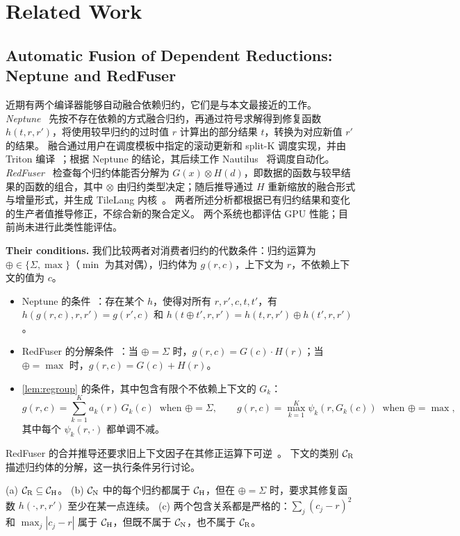 \section{Related Work}
\label{sec:related}

\subsection{Automatic Fusion of Dependent Reductions: Neptune and RedFuser}
\label{sec:related-prior}

近期有两个编译器能够自动融合依赖归约，它们是与本文最接近的工作。
\emph{Neptune}~\citep{neptune} 先按不存在依赖的方式融合归约，再通过符号求解得到修复函数 $h(t,r,r')$，将使用较早归约的过时值 $r$ 计算出的部分结果 $t$，转换为对应新值 $r'$ 的结果。
融合通过用户在调度模板中指定的滚动更新和 split-K 调度实现，并由 Triton 编译~\citep{triton}；根据 Neptune 的结论，其后续工作 Nautilus~\citep{nautilus} 将调度自动化。
\emph{RedFuser}~\citep{redfuser} 检查每个归约体能否分解为 $G(x)\otimes H(d)$，即数据的函数与较早结果的函数的组合，其中 $\otimes$ 由归约类型决定；随后推导通过 $H$ 重新缩放的融合形式与增量形式，并生成 TileLang 内核~\citep{tilelang}。
两者所述分析都根据已有归约结果和变化的生产者值推导修正，不综合新的聚合定义。
两个系统也都评估 GPU 性能；\sys 目前尚未进行此类性能评估。

\textbf{Their conditions.}
我们比较两者对消费者归约的代数条件：归约运算为 $\oplus\in\{\Sigma,\max\}$（$\min$ 为其对偶），归约体为 $g(r,c)$，上下文为 $r$，不依赖上下文的值为 $c$。
\begin{itemize}
\item[$\Cls{N}$:] Neptune 的条件~\citep[Eq.~3--4]{neptune}：存在某个 $h$，使得对所有 $r,r',c,t,t'$，有 $h(g(r,c),r,r')=g(r',c)$ 和 $h(t\oplus t',r,r')=h(t,r,r')\oplus h(t',r,r')$。
\item[$\Cls{R}$:] RedFuser 的分解条件~\citep[Eq.~4, Tab.~1]{redfuser}：当 $\oplus=\Sigma$ 时，$g(r,c)=G(c)\cdot H(r)$；当 $\oplus=\max$ 时，$g(r,c)=G(c)+H(r)$。
\item[$\Cls{H}$:] \cref{lem:regroup} 的条件，其中包含有限个不依赖上下文的 $G_k$：
\[
g(r,c)=\sum_{k=1}^{K}a_k(r)\,G_k(c)\ \text{ when }\oplus=\Sigma,\qquad
g(r,c)=\max_{k=1}^{K}\psi_k(r,G_k(c))\ \text{ when }\oplus=\max,
\]
其中每个 $\psi_k(r,\cdot)$ 都单调不减。
\end{itemize}
RedFuser 的合并推导还要求旧上下文因子在其修正运算下可逆~\citep[\S3.2.2]{redfuser}。
下文的类别 $\Cls{R}$ 描述归约体的分解，这一执行条件另行讨论。

\begin{theorem}[Containment]
\label{thm:containment}
(a) $\mathcal{C}_{\mathrm{R}}\subseteq\mathcal{C}_{\mathrm{H}}$。
(b) $\Cls{N}$ 中的每个归约都属于 $\Cls{H}$，但在 $\oplus=\Sigma$ 时，要求其修复函数 $h(\cdot,r,r')$ 至少在某一点连续。
(c) 两个包含关系都是严格的：$\sum_j (c_j-r)^2$ 和 $\max_j |c_j-r|$ 属于 $\Cls{H}$，但既不属于 $\Cls{N}$，也不属于 $\Cls{R}$。
\end{theorem}

